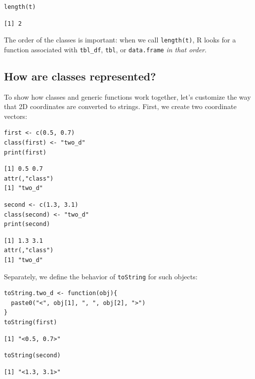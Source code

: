\begin{lstlisting}
length(t)
\end{lstlisting}

\begin{lstlisting}
[1] 2
\end{lstlisting}

\noindent
The order of the classes is important:
when we call \texttt{length(t)},
R looks for a function associated with \texttt{tbl\_df}, \texttt{tbl}, or \texttt{data.frame}
\emph{in that order}.

\subsection*{How are classes represented?}

To show how classes and generic functions work together,
let's customize the way that 2D coordinates are converted to strings.
First,
we create two coordinate vectors:

\begin{lstlisting}
first <- c(0.5, 0.7)
class(first) <- "two_d"
print(first)
\end{lstlisting}

\begin{lstlisting}
[1] 0.5 0.7
attr(,"class")
[1] "two_d"
\end{lstlisting}

\begin{lstlisting}
second <- c(1.3, 3.1)
class(second) <- "two_d"
print(second)
\end{lstlisting}

\begin{lstlisting}
[1] 1.3 3.1
attr(,"class")
[1] "two_d"
\end{lstlisting}

Separately,
we define the behavior of \texttt{toString} for such objects:

\begin{lstlisting}
toString.two_d <- function(obj){
  paste0("<", obj[1], ", ", obj[2], ">")
}
toString(first)
\end{lstlisting}

\begin{lstlisting}
[1] "<0.5, 0.7>"
\end{lstlisting}

\begin{lstlisting}
toString(second)
\end{lstlisting}

\begin{lstlisting}
[1] "<1.3, 3.1>"
\end{lstlisting}


